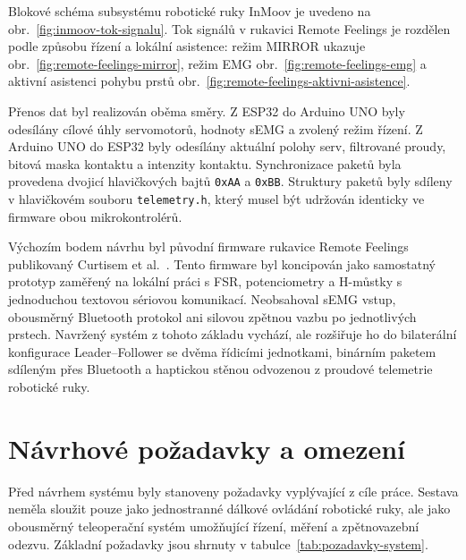 \documentclass[FZS,DP]{tulthesis}
\begin{document}
Blokové schéma subsystému robotické ruky InMoov je uvedeno na obr.~\ref{fig:inmoov-tok-signalu}. Tok signálů v rukavici Remote Feelings je rozdělen podle způsobu řízení a lokální asistence: režim MIRROR ukazuje obr.~\ref{fig:remote-feelings-mirror}, režim EMG obr.~\ref{fig:remote-feelings-emg} a aktivní asistenci pohybu prstů obr.~\ref{fig:remote-feelings-aktivni-asistence}.









Přenos dat byl realizován oběma směry. Z ESP32 do Arduino UNO byly odesílány cílové úhly servomotorů, hodnoty sEMG a zvolený režim řízení. Z Arduino UNO do ESP32 byly odesílány aktuální polohy serv, filtrované proudy, bitová maska kontaktu a intenzity kontaktu. Synchronizace paketů byla provedena dvojicí hlavičkových bajtů \texttt{0xAA} a \texttt{0xBB}. Struktury paketů byly sdíleny v hlavičkovém souboru \texttt{telemetry.h}, který musel být udržován identicky ve firmware obou mikrokontrolérů.

Výchozím bodem návrhu byl původní firmware rukavice Remote Feelings publikovaný Curtisem et al.~\cite{Curtis2021}. Tento firmware byl koncipován jako samostatný prototyp zaměřený na lokální práci s FSR, potenciometry a H-můstky s jednoduchou textovou sériovou komunikací. Neobsahoval sEMG vstup, obousměrný Bluetooth protokol ani silovou zpětnou vazbu po jednotlivých prstech. Navržený systém z tohoto základu vychází, ale rozšiřuje ho do bilaterální konfigurace Leader--Follower se dvěma řídicími jednotkami, binárním paketem sdíleným přes Bluetooth a haptickou stěnou odvozenou z proudové telemetrie robotické ruky.

\section{Návrhové požadavky a omezení}
\label{sec:pozadavky-omezeni}

Před návrhem systému byly stanoveny požadavky vyplývající z cíle práce. Sestava neměla sloužit pouze jako jednostranné dálkové ovládání robotické ruky, ale jako obousměrný teleoperační systém umožňující řízení, měření a zpětnovazební odezvu. Základní požadavky jsou shrnuty v tabulce~\ref{tab:pozadavky-system}.
\end{document}
